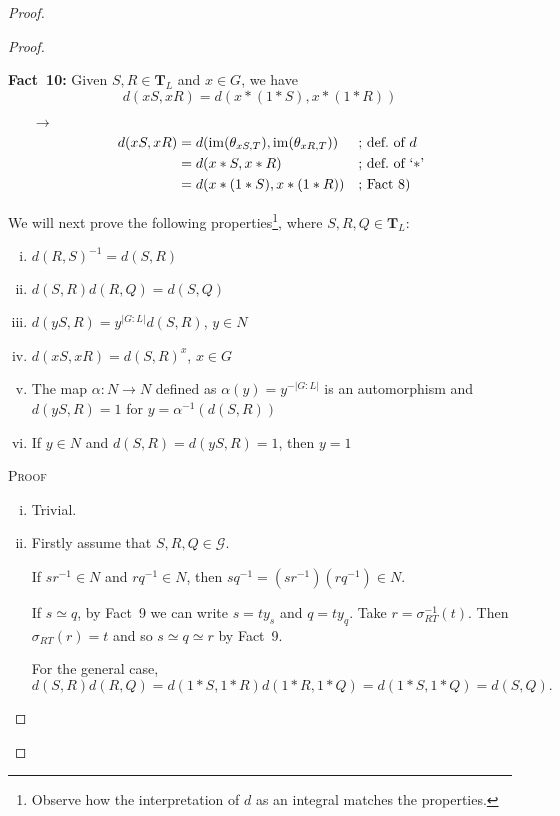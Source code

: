 \begin{solution}
\begin{proof}
\begin{proof}
\begin{enumerate}[\rm a)]
    \textbf{Fact~10:} Given $S,R\in\mathbf T_L$ and $x\in G$, we have 
    $$
        d(xS,xR) = d(x\ast(1\ast S),x\ast(1\ast R))
    $$
    {\small
    \begin{enumerate}
        \item[$\to$]
        \begin{align*}
            d(xS,xR) &= d(\operatorname{im}(\theta_{xS,T}),\operatorname{im}(\theta_{xR,T}))
                    &&\text{; def.~of $d$}\\
                &= d(x\ast S,x\ast R)
                    &&\text{; def.~of `$\ast$'}\\
                &= d(x\ast(1\ast S),x\ast(1\ast R))
                    &&\text{; Fact 8)}
        \end{align*}
    \end{enumerate}
    }

    \medskip
    
    We will next prove the following properties\footnote{Observe how the interpretation of $d$ as an integral matches the properties.}, where $S,R,Q\in\mathbf T_L$:
    \begin{enumerate}[i)]
        \item $d(R,S)^{-1} = d(S,R)$
        \item $d(S,R)d(R,Q) = d(S,Q)$
        \item $d(yS,R) = y^{|G:L|}d(S,R)$, $y\in N$
        \item $d(xS,xR) = d(S,R)^x$, $x\in G$
        \item The map $\alpha\colon N\to N$ defined as $\alpha(y)=y^{-|G:L|}$ is an automorphism and $d(yS,R) = 1$ for $y = \alpha^{-1}(d(S,R))$
        \item If $y\in N$ and $d(S,R)=d(yS,R) = 1$, then $y = 1$
    \end{enumerate}
    {\small
    \textsc{Proof}
    \begin{enumerate}[i)]
        \item Trivial.

        \item Firstly assume that $S,R,Q\in\mathcal G$.
        
        If $sr^{-1}\in N$ and $rq^{-1}\in N$, then $sq^{-1}=(sr^{-1})(rq^{-1})\in N$.
            
        If $s\simeq q$, by Fact~9 we can write $s=ty_s$ and $q=ty_q$. Take $r=\sigma_{RT}^{-1}(t)$. Then $\sigma_{RT}(r)=t$ and so $s\simeq q\simeq r$ by Fact~9.

        For the general case,
        $$
            d(S,R)d(R,Q)=d(1\ast S,1\ast R)d(1\ast R,1\ast Q)
                = d(1\ast S,1\ast Q) = d(S,Q).
        $$


\end{enumerate}}
\end{enumerate}
\end{proof}
\end{proof}
\end{solution}
